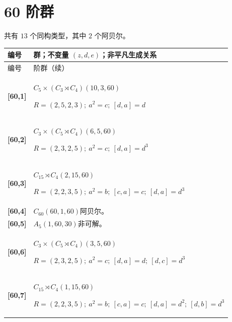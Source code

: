 \documentclass[UTF8,fontset=fandol,11pt,a4paper]{ctexart}
\begin{document}
\section*{60 阶群}\label{order:60}

共有 $13$ 个同构类型，其中 $2$ 个阿贝尔。

\begingroup\small\setlength{\tabcolsep}{3pt}\renewcommand{\arraystretch}{1.12}

\begin{longtable}{@{}p{17mm}>{\raggedright\arraybackslash}p{141mm}@{}}

\toprule 编号 & 群；不变量 $(z,d,e)$；非平凡生成关系\\\midrule\endfirsthead

\toprule 编号 & 60 阶群（续）\\\midrule\endhead\bottomrule\endfoot

\textbf{[60,1]} & $C_{5}\times (C_{3}\rtimes C_{4})$\quad $(10,3,60)$\par\(R=(2,5,2,3);\allowbreak\ a^{2}=c;\allowbreak\ [d,a]=d\)\\[3pt]

\textbf{[60,2]} & $C_{3}\times (C_{5}\rtimes C_{4})$\quad $(6,5,60)$\par\(R=(2,3,2,5);\allowbreak\ a^{2}=c;\allowbreak\ [d,a]=d^{3}\)\\[3pt]

\textbf{[60,3]} & $C_{15}\rtimes C_{4}$\quad $(2,15,60)$\par\(R=(2,2,3,5);\allowbreak\ a^{2}=b;\allowbreak\ [c,a]=c;\allowbreak\ [d,a]=d^{3}\)\\[3pt]

\textbf{[60,4]} & $C_{60}$\quad $(60,1,60)$\quad 阿贝尔。\\[3pt]

\textbf{[60,5]} & $A_{5}$\quad $(1,60,30)$\quad 非可解。\\[3pt]

\textbf{[60,6]} & $C_{3}\times (C_{5}\rtimes C_{4})$\quad $(3,5,60)$\par\(R=(2,3,2,5);\allowbreak\ a^{2}=c;\allowbreak\ [d,a]=d;\allowbreak\ [d,c]=d^{3}\)\\[3pt]

\textbf{[60,7]} & $C_{15}\rtimes C_{4}$\quad $(1,15,60)$\par\(R=(2,2,3,5);\allowbreak\ a^{2}=b;\allowbreak\ [c,a]=c;\allowbreak\ [d,a]=d^{2};\allowbreak\ [d,b]=d^{3}\)\\[3pt]


\end{longtable}
\end{document}
